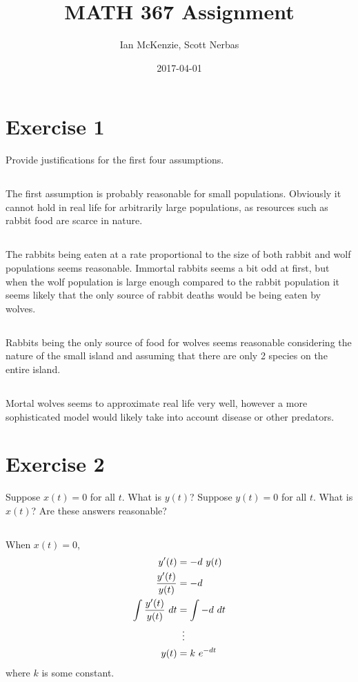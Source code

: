 \documentclass{article}
\title{MATH 367 Assignment}
\date{2017-04-01}
\author{Ian McKenzie, Scott Nerbas}
\begin{document}
\maketitle
\newpage
{}

\section{Exercise 1}
Provide justifications for the first four assumptions.
\subsection{}
The first assumption is probably reasonable for small populations.
Obviously it cannot hold in real life for arbitrarily large populations, as resources such as rabbit food are scarce in nature.
\subsection{}
The rabbits being eaten at a rate proportional to the size of both rabbit and wolf
populations seems reasonable.
Immortal rabbits seems a bit odd at first, but when the wolf population is large enough compared to the rabbit population it seems likely that the only source of rabbit deaths would be being eaten by wolves.
\subsection{}
Rabbits being the only source of food for wolves seems reasonable considering the nature of the small island and assuming that there are only 2 species on the entire island.
\subsection{}
Mortal wolves seems to approximate real life very well, however a more sophisticated model would likely take into account disease or other predators.

\section{Exercise 2}
Suppose $x(t)=0$ for all $t$. What is $y(t)$? Suppose $y(t)=0$ for all $t$. What is $x(t)$?
Are these answers reasonable?
\subsection{}
When $x(t)=0$,
\begin{align*}
  y'(t) &= -d~y(t) \\
  \frac{y'(t)}{y(t)} &= -d \\
  \int \frac{y'(t)}{y(t)}~dt &= \int -d~dt \\
  &\setbox0\hbox{=}\mathrel{\makebox[\wd0]{\hfil\vdots\hfil}} \\
  y(t) &= k~e^{-dt} \\
\end{align*}
where $k$ is some constant.
\end{document}
